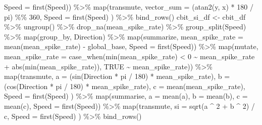 \documentclass[
]{book}
\newenvironment{Shaded}{\begin{snugshade}}{\end{snugshade}}
\newcommand{\AttributeTok}[1]{\textcolor[rgb]{0.77,0.63,0.00}{#1}}
\newcommand{\ConstantTok}[1]{\textcolor[rgb]{0.00,0.00,0.00}{#1}}
\newcommand{\DecValTok}[1]{\textcolor[rgb]{0.00,0.00,0.81}{#1}}
\newcommand{\FunctionTok}[1]{\textcolor[rgb]{0.00,0.00,0.00}{#1}}
\newcommand{\NormalTok}[1]{#1}
\newcommand{\OtherTok}[1]{\textcolor[rgb]{0.56,0.35,0.01}{#1}}
\newcommand{\SpecialCharTok}[1]{\textcolor[rgb]{0.00,0.00,0.00}{#1}}
\begin{document}
\begin{Shaded}
\begin{Highlighting}[]
      \AttributeTok{Speed =} \FunctionTok{first}\NormalTok{(Speed)) }\SpecialCharTok{\%\textgreater{}\%}
  \FunctionTok{map}\NormalTok{(transmute,}
      \AttributeTok{vector\_sum =}\NormalTok{ (}\FunctionTok{atan2}\NormalTok{(y, x) }\SpecialCharTok{*} \DecValTok{180} \SpecialCharTok{/}\NormalTok{ pi) }\SpecialCharTok{\%\%} \DecValTok{360}\NormalTok{,}
      \AttributeTok{Speed =} \FunctionTok{first}\NormalTok{(Speed)}
\NormalTok{  ) }\SpecialCharTok{\%\textgreater{}\%}
  \FunctionTok{bind\_rows}\NormalTok{()}
\NormalTok{cbit\_si\_df }\OtherTok{\textless{}{-}}
\NormalTok{  cbit\_df }\SpecialCharTok{\%\textgreater{}\%}
  \FunctionTok{ungroup}\NormalTok{() }\SpecialCharTok{\%\textgreater{}\%}
  \FunctionTok{drop\_na}\NormalTok{(mean\_spike\_rate) }\SpecialCharTok{\%\textgreater{}\%}
  \FunctionTok{group\_split}\NormalTok{(Speed) }\SpecialCharTok{\%\textgreater{}\%}
  \FunctionTok{map}\NormalTok{(group\_by, Direction) }\SpecialCharTok{\%\textgreater{}\%}
  \FunctionTok{map}\NormalTok{(summarize,}
      \AttributeTok{mean\_spike\_rate =} \FunctionTok{mean}\NormalTok{(mean\_spike\_rate) }\SpecialCharTok{{-}}\NormalTok{ global\_base,}
      \AttributeTok{Speed =} \FunctionTok{first}\NormalTok{(Speed)) }\SpecialCharTok{\%\textgreater{}\%}
  \FunctionTok{map}\NormalTok{(mutate,}
      \AttributeTok{mean\_spike\_rate =}
        \FunctionTok{case\_when}\NormalTok{(}\FunctionTok{min}\NormalTok{(mean\_spike\_rate) }\SpecialCharTok{\textless{}} \DecValTok{0} \SpecialCharTok{\textasciitilde{}}\NormalTok{ mean\_spike\_rate }\SpecialCharTok{+} \FunctionTok{abs}\NormalTok{(}\FunctionTok{min}\NormalTok{(mean\_spike\_rate)),}
                  \ConstantTok{TRUE} \SpecialCharTok{\textasciitilde{}}\NormalTok{ mean\_spike\_rate)) }\SpecialCharTok{\%\textgreater{}\%}
  \FunctionTok{map}\NormalTok{(transmute,}
      \AttributeTok{a =}\NormalTok{ (}\FunctionTok{sin}\NormalTok{(Direction }\SpecialCharTok{*}\NormalTok{ pi }\SpecialCharTok{/} \DecValTok{180}\NormalTok{) }\SpecialCharTok{*}\NormalTok{ mean\_spike\_rate),}
      \AttributeTok{b =}\NormalTok{ (}\FunctionTok{cos}\NormalTok{(Direction }\SpecialCharTok{*}\NormalTok{ pi }\SpecialCharTok{/} \DecValTok{180}\NormalTok{) }\SpecialCharTok{*}\NormalTok{ mean\_spike\_rate),}
      \AttributeTok{c =} \FunctionTok{mean}\NormalTok{(mean\_spike\_rate),}
      \AttributeTok{Speed =} \FunctionTok{first}\NormalTok{(Speed)}
\NormalTok{  ) }\SpecialCharTok{\%\textgreater{}\%}
  \FunctionTok{map}\NormalTok{(summarise,}
      \AttributeTok{a =} \FunctionTok{mean}\NormalTok{(a),}
      \AttributeTok{b =} \FunctionTok{mean}\NormalTok{(b),}
      \AttributeTok{c =} \FunctionTok{mean}\NormalTok{(c),}
      \AttributeTok{Speed =} \FunctionTok{first}\NormalTok{(Speed)) }\SpecialCharTok{\%\textgreater{}\%}
  \FunctionTok{map}\NormalTok{(transmute,}
      \AttributeTok{si =} \FunctionTok{sqrt}\NormalTok{(a }\SpecialCharTok{\^{}} \DecValTok{2} \SpecialCharTok{+}\NormalTok{ b }\SpecialCharTok{\^{}} \DecValTok{2}\NormalTok{) }\SpecialCharTok{/}\NormalTok{ c,}
      \AttributeTok{Speed =} \FunctionTok{first}\NormalTok{(Speed)}
\NormalTok{  ) }\SpecialCharTok{\%\textgreater{}\%}
  \FunctionTok{bind\_rows}\NormalTok{()}


\end{Highlighting}
\end{Shaded}
\end{document}
